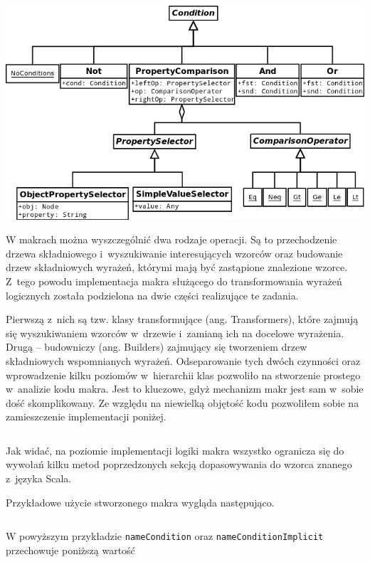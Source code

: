 \documentclass[brudnopis]{xmgr}
\begin{document}
\includegraphics[scale=0.5]{images/conditions-uml.png}

W makrach można wyszczególnić dwa rodzaje operacji. Są to przechodzenie drzewa składniowego i~wyszukiwanie interesujących wzorców oraz budowanie drzew składniowych wyrażeń, którymi mają być zastąpione znalezione wzorce. Z~tego powodu implementacja makra służącego do transformowania wyrażeń logicznych została podzielona na dwie części realizujące te zadania.

Pierwszą z~nich są tzw. klasy transformujące (ang. Transformers), które zajmują się wyszukiwaniem wzorców w~drzewie i~zamianą ich na docelowe wyrażenia. Drugą -- budowniczy (ang. Builders) zajmujący się tworzeniem drzew składniowych wspomnianych wyrażeń. Odseparowanie tych dwóch czynności oraz wprowadzenie kilku poziomów w~hierarchii klas pozwoliło na stworzenie prostego w~analizie kodu makra. Jest to kluczowe, gdyż mechanizm makr jest sam w~sobie dość skomplikowany.  Ze względu na niewielką objętość kodu pozwoliłem sobie na zamieszczenie implementacji poniżej.

\inputminted{scala}{listings/scala/boolean-macro-implementation.scala}

Jak widać, na poziomie implementacji logiki makra wszystko ogranicza się do wywołań kilku metod poprzedzonych sekcją dopasowywania do wzorca znanego z~języka Scala.

\medskip\noindent Przykładowe użycie stworzonego makra wygląda następująco.

\inputminted{scala}{listings/scala/macro-usage.scala}

W powyższym przykładzie \texttt{nameCondition} oraz  \texttt{nameConditionImplicit} przechowuje poniższą wartość

\inputminted{scala}{listings/scala/macro-usage-result.scala}
\end{document}
